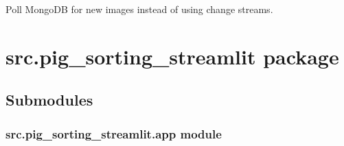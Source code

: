 \documentclass[letterpaper,10pt,english]{sphinxmanual}
\begin{document}

\begin{fulllineitems}
\label{\detokenize{modules/src.pig_sorting_api.main:src.pig_sorting_api.main.watch_mongo}}
\pysigstartsignatures
\pysiglinewithargsret
{}
{}
{}
\pysigstopsignatures
\sphinxAtStartPar
Poll MongoDB for new images instead of using change streams.

\end{fulllineitems}


\sphinxstepscope


\section{src.pig\_sorting\_streamlit package}
\label{\detokenize{modules/src.pig_sorting_streamlit:module-src.pig_sorting_streamlit}}\label{\detokenize{modules/src.pig_sorting_streamlit:src-pig-sorting-streamlit-package}}\label{\detokenize{modules/src.pig_sorting_streamlit::doc}}

\subsection{Submodules}
\label{\detokenize{modules/src.pig_sorting_streamlit:submodules}}
\sphinxstepscope


\subsubsection{src.pig\_sorting\_streamlit.app module}
\label{\detokenize{modules/src.pig_sorting_streamlit.app:module-src.pig_sorting_streamlit.app}}\label{\detokenize{modules/src.pig_sorting_streamlit.app:src-pig-sorting-streamlit-app-module}}\label{\detokenize{modules/src.pig_sorting_streamlit.app::doc}}
\end{document}
